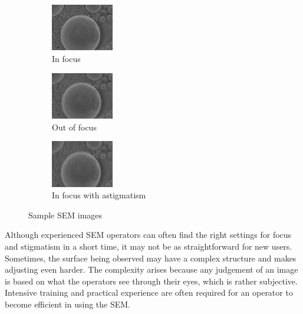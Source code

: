 \documentclass{article}
\begin{document}
\begin{figure}
    \centering
    \begin{subfigure}{\textwidth}
        \centering
        \includegraphics[width=0.3\textwidth]{Images/A in focus.jpg}
        \caption{In focus}
        \label{A in focus}
    \end{subfigure}
    \begin{subfigure}{\textwidth}
        \centering
        \includegraphics[width=0.3\textwidth]{Images/A out of focus.jpg}
        \caption{Out of focus}
        \label{A out of focus}
    \end{subfigure}
    \begin{subfigure}{\textwidth}
        \centering
        \includegraphics[width=0.3\textwidth]{Images/A astigmatism.jpg}
        \caption{In focus with astigmatism}
        \label{A astigmatism}
    \end{subfigure}
    \caption{Sample SEM images}
    \label{Sample SEM images}
\end{figure}

Although experienced SEM operators can often find the right settings for focus and stigmatism in a short time, it may not be as straightforward for new users. Sometimes, the surface being observed may have a complex structure and makes adjusting even harder. The complexity arises because any judgement of an image is based on what the operators see through their eyes, which is rather subjective. Intensive training and practical experience are often required for an operator to become efficient in using the SEM.
\end{document}

